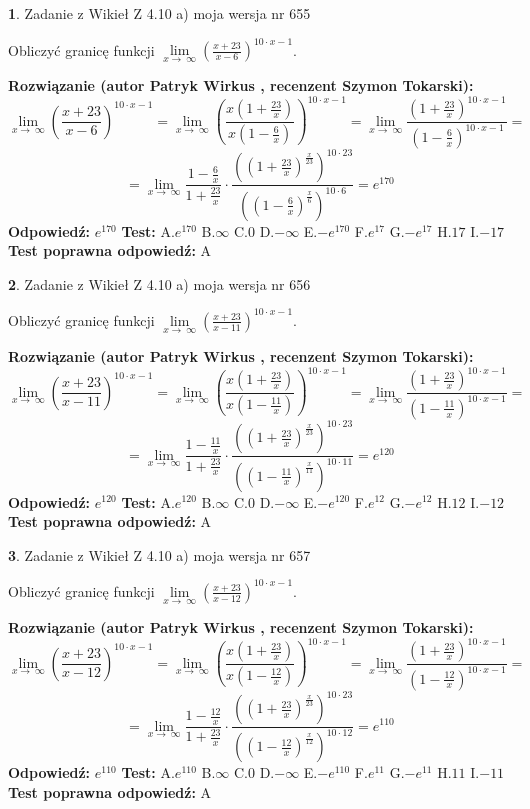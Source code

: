\documentclass[12pt, a4paper]{article}
\theoremstyle{definition} %
\newtheorem{zad}{}
\newcommand{\zadStart}[1]{\begin{zad}#1\newline}
\newcommand{\zadStop}{\end{zad}}
\newcommand{\rozwStart}[2]{\noindent \textbf{Rozwiązanie (autor #1 , recenzent #2): }\newline}
\newcommand{\rozwStop}{\newline}
\newcommand{\odpStart}{\noindent \textbf{Odpowiedź:}\newline}
\newcommand{\odpStop}{\newline}
\newcommand{\testStart}{\noindent \textbf{Test:}\newline}
\newcommand{\testStop}{\newline}
\newcommand{\kluczStart}{\noindent \textbf{Test poprawna odpowiedź:}\newline}
\newcommand{\kluczStop}{\newline}
\begin{document}
\zadStart{Zadanie z Wikieł Z 4.10 a) moja wersja nr 655}

Obliczyć granicę funkcji  $\lim\limits_{x\to\ \infty}(\frac{x+23}{x-6})^{10\cdot x-1}$.
\zadStop
\rozwStart{Patryk Wirkus}{Szymon Tokarski}
$$\lim\limits_{x\to\ \infty}(\frac{x+23}{x-6})^{10\cdot x-1} = \lim\limits_{x\to\ \infty}(\frac{x(1+\frac{23}{x})}{x(1-\frac{6}{x})})^{10\cdot x-1}=\lim\limits_{x\to\ \infty}\frac{(1+\frac{23}{x})^{10\cdot x-1}}{(1-\frac{6}{x})^{10\cdot x-1}}=$$
$$=\lim\limits_{x\to\ \infty}\frac{1-\frac{6}{x}}{1+\frac{23}{x}}\cdot\frac{((1+\frac{23}{x})^{\frac{x}{23}})^{10\cdot23}}{((1-\frac{6}{x})^{\frac{x}{6}})^{10\cdot6}}=e^{170}$$
\rozwStop
\odpStart
$e^{170}$
\odpStop
\testStart
A.$e^{170}$ B.$\infty$ C.$0$ D.$-\infty$ E.$-e^{170}$
F.$e^{17}$ G.$-e^{17}$
H.$17$
I.$-17$
\testStop
\kluczStart
A
\kluczStop



\zadStart{Zadanie z Wikieł Z 4.10 a) moja wersja nr 656}

Obliczyć granicę funkcji  $\lim\limits_{x\to\ \infty}(\frac{x+23}{x-11})^{10\cdot x-1}$.
\zadStop
\rozwStart{Patryk Wirkus}{Szymon Tokarski}
$$\lim\limits_{x\to\ \infty}(\frac{x+23}{x-11})^{10\cdot x-1} = \lim\limits_{x\to\ \infty}(\frac{x(1+\frac{23}{x})}{x(1-\frac{11}{x})})^{10\cdot x-1}=\lim\limits_{x\to\ \infty}\frac{(1+\frac{23}{x})^{10\cdot x-1}}{(1-\frac{11}{x})^{10\cdot x-1}}=$$
$$=\lim\limits_{x\to\ \infty}\frac{1-\frac{11}{x}}{1+\frac{23}{x}}\cdot\frac{((1+\frac{23}{x})^{\frac{x}{23}})^{10\cdot23}}{((1-\frac{11}{x})^{\frac{x}{11}})^{10\cdot11}}=e^{120}$$
\rozwStop
\odpStart
$e^{120}$
\odpStop
\testStart
A.$e^{120}$ B.$\infty$ C.$0$ D.$-\infty$ E.$-e^{120}$
F.$e^{12}$ G.$-e^{12}$
H.$12$
I.$-12$
\testStop
\kluczStart
A
\kluczStop



\zadStart{Zadanie z Wikieł Z 4.10 a) moja wersja nr 657}

Obliczyć granicę funkcji  $\lim\limits_{x\to\ \infty}(\frac{x+23}{x-12})^{10\cdot x-1}$.
\zadStop
\rozwStart{Patryk Wirkus}{Szymon Tokarski}
$$\lim\limits_{x\to\ \infty}(\frac{x+23}{x-12})^{10\cdot x-1} = \lim\limits_{x\to\ \infty}(\frac{x(1+\frac{23}{x})}{x(1-\frac{12}{x})})^{10\cdot x-1}=\lim\limits_{x\to\ \infty}\frac{(1+\frac{23}{x})^{10\cdot x-1}}{(1-\frac{12}{x})^{10\cdot x-1}}=$$
$$=\lim\limits_{x\to\ \infty}\frac{1-\frac{12}{x}}{1+\frac{23}{x}}\cdot\frac{((1+\frac{23}{x})^{\frac{x}{23}})^{10\cdot23}}{((1-\frac{12}{x})^{\frac{x}{12}})^{10\cdot12}}=e^{110}$$
\rozwStop
\odpStart
$e^{110}$
\odpStop
\testStart
A.$e^{110}$ B.$\infty$ C.$0$ D.$-\infty$ E.$-e^{110}$
F.$e^{11}$ G.$-e^{11}$
H.$11$
I.$-11$
\testStop
\kluczStart
A
\kluczStop
\end{document}

